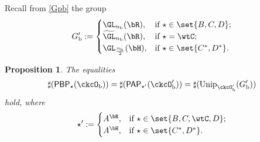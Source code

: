 \documentclass[12pt,a4paper]{amsart}
\def\abs#1{\left|{#1}\right|}
\numberwithin{equation}{section}
\newtheorem{prop}[thm]{Proposition}
\theoremstyle{remark}
\def\half{{\tfrac{1}{2}}}
\def\Unip{\mathrm{Unip}}
\def\PP{\mathsf{PAP}}
\def\cupcol{{\stackrel{c}{\sqcup}}}
\def\PBP{\mathsf{PBP}}
\def\cupcol{{\,\stackrel{c}{\sqcup}\,}}
\def\ckcOb{\ckcO_{\mathrm b}}
\def\ckcOpb{\ckcO'_{\mathrm b}}
\def\Gpb{G'_{\mathrm b}}
\begin{document}



Recall from \eqref{Gpb} the group
\[
  G'_{\mathrm b} := \begin{cases}
    \GL_{n_{\mathrm b}}(\bR), & \text{if } \star \in \set{B,C,D}; \\
    \widetilde{\GL}_{n_{\mathrm b}}(\bR), & \text{if } \star = \wtC; \\
    \GL_{\frac{n_{\mathrm b}}{2}}(\bH), & \text{if } \star \in \set{C^{*},D^{*}}.\\
  \end{cases}
\]

\begin{prop}\label{prop:BP.PP} %
  The equalities
\[
    \begin{split}
      \sharp(\PBP_{\star}(\ckcO_{\mathrm b})) = \sharp(\PP_{\star '}(\ckcO'_{\mathrm b})) = \sharp(\Unip_{\ckcO'_{\mathrm b}}(G'_{\mathrm b}))
    \end{split}
  \]
  hold, where
\begin{equation}\label{def:star'}
\star ':= \begin{cases}
    A^{\bR}, & \text{if } \star \in \set{B,C,\wtC,D}; \\
    A^{\bH}, & \text{if } \star \in \set{C^{*},D^{*}}.\\
  \end{cases}
  \end{equation}
\end{prop}
\end{document}
